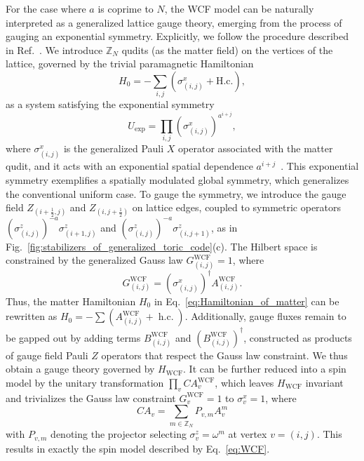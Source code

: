 \documentclass[aps,prb,english,superscriptaddress,twocolumn,tightenlines,showpacs,longbibliography,floatfix,amsfonts]{revtex4-2}
\begin{document}
For the case where $a$ is coprime to $N$, the WCF model can be naturally interpreted as a generalized lattice gauge theory, emerging from the process of gauging an exponential symmetry. Explicitly, we follow the procedure described in Ref.~\cite{Shirley2019}. We introduce $\mathbb{Z}_N$ qudits (as the matter field) on the vertices of the lattice, governed by the trivial paramagnetic Hamiltonian
\begin{equation}
    H_0=-\sum_{i,j}\left(\sigma_{(i,j)}^{x}+\mathrm{H.c.}\right),\label{eq:Hamiltonian_of_matter}
\end{equation}
as a system satisfying the exponential symmetry
\begin{equation}
    U_{\operatorname{exp}}=\prod_{i,j}(\sigma_{(i,j)}^{x})^{a^{i+j}},\label{eq:symmetry_GTC}
\end{equation}
where $\sigma_{(i,j)}^{x}$ is the generalized Pauli $X$ operator associated with the matter qudit, and it acts with an exponential spatial dependence $a^{i+j}$~\cite{note}. 
This exponential symmetry exemplifies a spatially modulated global symmetry, which generalizes the conventional uniform case.
To gauge the symmetry, we introduce the gauge field $Z_{(i+\frac{1}{2},j)}$ and $Z_{(i,j+\frac{1}{2})}$ on lattice edges, coupled to symmetric operators $(\sigma^{z}_{(i,j)})^{-a} \sigma^{z}_{(i+1,j)}$ and $(\sigma^{z}_{(i,j)})^{-a}\sigma^{z}_{(i,j+1)}$, as in Fig.~\ref{fig:stabilizers_of_generalized_toric_code}(c). The Hilbert space is constrained by the generalized Gauss law $G_{(i,j)}^{\operatorname{WCF}}=1$, where
\begin{equation}
    G_{(i,j)}^{\operatorname{WCF}}=(\sigma_{(i,j)}^{x})^{\dagger}A_{(i,j)}^{\operatorname{WCF}}.\label{eq:GTC_local_symmetry}
\end{equation}
Thus, the matter Hamiltonian $H_0$ in Eq.~\eqref{eq:Hamiltonian_of_matter} can be rewritten as $H_0 = -\sum (A^{\operatorname{WCF}}_{(i,j)} + \operatorname{h.c.})$. Additionally, gauge fluxes remain to be gapped out by adding terms $B_{(i,j)}^{\operatorname{WCF}}$ and $(B_{(i,j)}^{\operatorname{WCF}})^{\dagger}$, constructed as products of gauge field Pauli $Z$ operators that respect the Gauss law constraint. 
We thus obtain a gauge theory governed by $H_{\operatorname{WCF}}$. It can be further reduced into a spin model by the unitary transformation $\prod_{v} CA^{\operatorname{WCF}}_{v}$, 
which leaves $H_{\operatorname{WCF}}$ invariant and trivializes the Gauss law constraint $G_{v}^{\operatorname{WCF}}=1$ to $\sigma_{v}^{x}=1$, where 
\begin{equation}
CA_{v}=\sum_{m\in\mathbb{Z}_{N}}P_{v,m}A_{v}^{m}
\end{equation}
with $P_{v,m}$ denoting the projector selecting $\sigma_v^{z}=\omega^m$ at vertex $v=(i,j)$. This results in exactly the spin model described by Eq.~\eqref{eq:WCF}.
\end{document}
